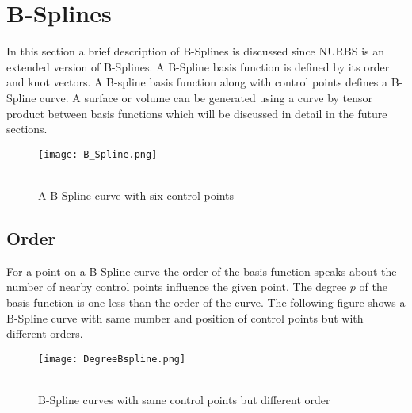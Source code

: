 \documentclass[11pt]{article}
\begin{document}
\section{B-Splines } \label{B_Spline}
In this section a brief description of B-Splines is discussed since NURBS is an
extended version of B-Splines. A B-Spline basis function is defined by its order
and knot vectors. A B-spline basis function along with control points defines a
B-Spline curve. A surface or volume can be generated using a curve by tensor product between basis functions which will be discussed in detail in the future sections. 
\begin{figure}[H]
	\begin{center}
		\texttt{[image: B\_Spline.png]} 
		\caption{\\A B-Spline curve with six control points}\label{B_Spline}
	\end{center}	
\end{figure}
\subsection{Order }
For a point on a B-Spline curve the order of the basis function speaks about the
number of nearby control points influence the given point. The degree $p$ of the
basis function is one less than the order of the curve.
The following figure shows a B-Spline curve with same number and position of control points but with different orders.
\begin{figure}[H]
	\begin{center}
		\texttt{[image: DegreeBspline.png]} 
		\caption{\\B-Spline curves with same control points but different order}\label{DegreeBspline}
	\end{center}	
\end{figure}
\end{document}
